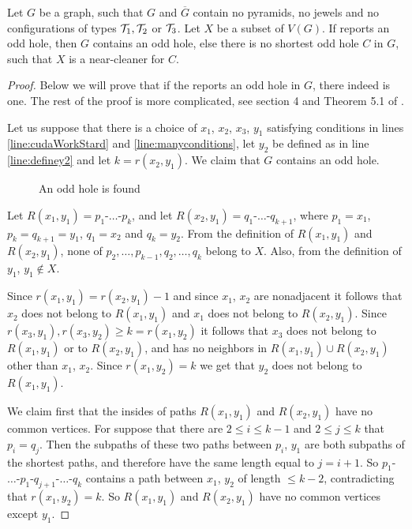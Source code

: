 \begin{theorem}
	\label{thm:testNCWorks}
	Let $G$ be a graph, such that $G$ and $\overline{G}$ contain no pyramids, no jewels and no configurations of types $\mathcal{T}_1, \mathcal{T}_2$ or $\mathcal{T}_3$. Let $X$ be a subset of $V(G)$. If  reports an odd hole, then $G$ contains an odd hole, else there is no shortest odd hole $C$ in $G$, such that $X$ is a near-cleaner for $C$.
\end{theorem}
\begin{proof}
	Below we will prove that if the  reports an odd hole in $G$, there indeed is one. The rest of the proof is more complicated, see section 4 and Theorem 5.1 of \cite{MC05}.

	Let us suppose that there is a choice of $x_1$, $x_2$, $x_3$, $y_1$ satisfying conditions in lines \ref{line:cudaWorkStard} and \ref{line:manyconditions}, let $y_2$ be defined as in line \ref{line:definey2} and let $k = r(x_2, y_1)$. We claim that $G$ contains an odd hole.
	
	{\makeatletter
	\let\par\@@par
	\par{}
	\everypar{}\begin{wrapfigure}{r}{0.35\textwidth}
		
		\caption{An odd hole is found}%
		\vspace{-0.3cm}
		\end{wrapfigure}
		Let $R(x_1, y_1) = p_1$-$\ldots$-$p_k$, and let $R(x_2, y_1) = q_1$-$\ldots$-$q_{k+1}$, where $p_1 = x_1$, $p_k = q_{k+1} = y_1$, $q_1 = x_2$ and $q_k = y_2$. From the definition of $R(x_1, y_1)$ and $R(x_2, y_1)$, none of $p_2, \ldots, p_{k-1}, q_2, \ldots, q_k$ belong to $X$. Also, from the definition of $y_1$, $y_1 \notin X$.

		Since $r(x_1, y_1) = r(x_2, y_1) - 1$ and since $x_1$, $x_2$ are nonadjacent it follows that $x_2$ does not belong to $R(x_1, y_1)$ and $x_1$ does not belong to $R(x_2, y_1)$. Since $r(x_3, y_1), r(x_3, y_2) \geq k = r(x_1, y_2)$ it follows that $x_3$ does not belong to $R(x_1, y_1)$ or to $R(x_2, y_1)$, and has no neighbors in $R(x_1, y_1) \cup R(x_2, y_1)$ other than $x_1$, $x_2$. Since $r(x_1, y_2) = k$ we get that $y_2$ does not belong to $R(x_1, y_1)$.
		
		We claim first that the insides of paths $R(x_1, y_1)$ and $R(x_2, y_1)$ have no common vertices. For suppose that there are $2 \leq i \leq k-1$ and $2 \leq j \leq k$ that $p_i = q_j$. Then the subpaths of these two paths between $p_i$, $y_1$ are both subpaths of the shortest paths, and therefore have the same length equal to $j=i+1$. So $p_1$-$\ldots$-$p_1$-$q_{j+1}$-$\ldots$-$q_k$ contains a path between $x_1$, $y_2$ of length $\leq k-2$, contradicting that $r(x_1, y_2) = k$. So $R(x_1, y_1)$ and $R(x_2, y_1)$ have no common vertices except $y_1$.\par}%


\end{proof}
